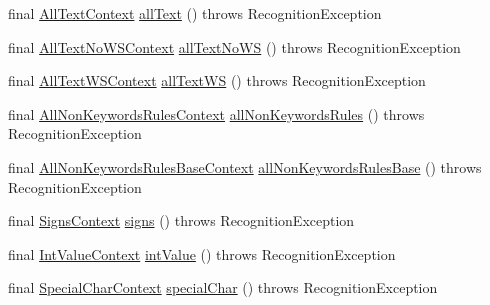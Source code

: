 \begin{DoxyCompactItemize}
\item 
final \hyperlink{classgov_1_1nasa_1_1jpf_1_1inspector_1_1client_1_1parser_1_1_console_grammar_parser_1_1_all_text_context}{All\+Text\+Context} \hyperlink{classgov_1_1nasa_1_1jpf_1_1inspector_1_1client_1_1parser_1_1_console_grammar_parser_a9dfaeb28734c8b3f7ec5a7b81ed7d42e}{all\+Text} ()  throws Recognition\+Exception 
\item 
final \hyperlink{classgov_1_1nasa_1_1jpf_1_1inspector_1_1client_1_1parser_1_1_console_grammar_parser_1_1_all_text_no_w_s_context}{All\+Text\+No\+W\+S\+Context} \hyperlink{classgov_1_1nasa_1_1jpf_1_1inspector_1_1client_1_1parser_1_1_console_grammar_parser_ac1f61b1a3d9917fc0f0920f3274d5b22}{all\+Text\+No\+WS} ()  throws Recognition\+Exception 
\item 
final \hyperlink{classgov_1_1nasa_1_1jpf_1_1inspector_1_1client_1_1parser_1_1_console_grammar_parser_1_1_all_text_w_s_context}{All\+Text\+W\+S\+Context} \hyperlink{classgov_1_1nasa_1_1jpf_1_1inspector_1_1client_1_1parser_1_1_console_grammar_parser_adc161fc81eedd939154fd25e889f5b28}{all\+Text\+WS} ()  throws Recognition\+Exception 
\item 
final \hyperlink{classgov_1_1nasa_1_1jpf_1_1inspector_1_1client_1_1parser_1_1_console_grammar_parser_1_1_all_non_keywords_rules_context}{All\+Non\+Keywords\+Rules\+Context} \hyperlink{classgov_1_1nasa_1_1jpf_1_1inspector_1_1client_1_1parser_1_1_console_grammar_parser_a2849ff1ee2341a3450b6fbdbe326336d}{all\+Non\+Keywords\+Rules} ()  throws Recognition\+Exception 
\item 
final \hyperlink{classgov_1_1nasa_1_1jpf_1_1inspector_1_1client_1_1parser_1_1_console_grammar_parser_1_1_all_non_keywords_rules_base_context}{All\+Non\+Keywords\+Rules\+Base\+Context} \hyperlink{classgov_1_1nasa_1_1jpf_1_1inspector_1_1client_1_1parser_1_1_console_grammar_parser_a926661be2c5cd242388c918b3de759c3}{all\+Non\+Keywords\+Rules\+Base} ()  throws Recognition\+Exception 
\item 
final \hyperlink{classgov_1_1nasa_1_1jpf_1_1inspector_1_1client_1_1parser_1_1_console_grammar_parser_1_1_signs_context}{Signs\+Context} \hyperlink{classgov_1_1nasa_1_1jpf_1_1inspector_1_1client_1_1parser_1_1_console_grammar_parser_ab04c24317356d7b5f9d1ba1b0a8ed331}{signs} ()  throws Recognition\+Exception 
\item 
final \hyperlink{classgov_1_1nasa_1_1jpf_1_1inspector_1_1client_1_1parser_1_1_console_grammar_parser_1_1_int_value_context}{Int\+Value\+Context} \hyperlink{classgov_1_1nasa_1_1jpf_1_1inspector_1_1client_1_1parser_1_1_console_grammar_parser_a132b5d5236398d90d8d1e6b16dc0bd20}{int\+Value} ()  throws Recognition\+Exception 
\item 
final \hyperlink{classgov_1_1nasa_1_1jpf_1_1inspector_1_1client_1_1parser_1_1_console_grammar_parser_1_1_special_char_context}{Special\+Char\+Context} \hyperlink{classgov_1_1nasa_1_1jpf_1_1inspector_1_1client_1_1parser_1_1_console_grammar_parser_ade082ae679f41cefb41bcb42544f08e5}{special\+Char} ()  throws Recognition\+Exception 
\end{DoxyCompactItemize}
